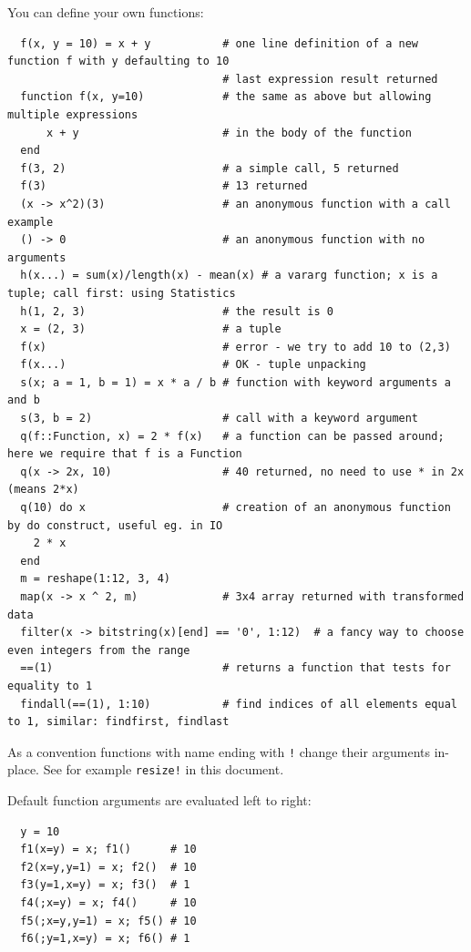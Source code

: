 \documentclass[10pt,a4paper]{article}
\begin{document}
You can define your own functions:
\begin{lstlisting}
  f(x, y = 10) = x + y           # one line definition of a new function f with y defaulting to 10
                                 # last expression result returned
  function f(x, y=10)            # the same as above but allowing multiple expressions
      x + y                      # in the body of the function
  end
  f(3, 2)                        # a simple call, 5 returned
  f(3)                           # 13 returned
  (x -> x^2)(3)                  # an anonymous function with a call example
  () -> 0                        # an anonymous function with no arguments
  h(x...) = sum(x)/length(x) - mean(x) # a vararg function; x is a tuple; call first: using Statistics
  h(1, 2, 3)                     # the result is 0
  x = (2, 3)                     # a tuple
  f(x)                           # error - we try to add 10 to (2,3)
  f(x...)                        # OK - tuple unpacking
  s(x; a = 1, b = 1) = x * a / b # function with keyword arguments a and b
  s(3, b = 2)                    # call with a keyword argument
  q(f::Function, x) = 2 * f(x)   # a function can be passed around; here we require that f is a Function
  q(x -> 2x, 10)                 # 40 returned, no need to use * in 2x (means 2*x)
  q(10) do x                     # creation of an anonymous function by do construct, useful eg. in IO
    2 * x
  end
  m = reshape(1:12, 3, 4)
  map(x -> x ^ 2, m)             # 3x4 array returned with transformed data
  filter(x -> bitstring(x)[end] == '0', 1:12)  # a fancy way to choose even integers from the range
  ==(1)                          # returns a function that tests for equality to 1
  findall(==(1), 1:10)           # find indices of all elements equal to 1, similar: findfirst, findlast
\end{lstlisting}

As a convention functions with name ending with \lstinline|!| change their
arguments in-place. See for example \lstinline|resize!| in this document.

Default function arguments are evaluated left to right:
\begin{lstlisting}
  y = 10
  f1(x=y) = x; f1()      # 10
  f2(x=y,y=1) = x; f2()  # 10
  f3(y=1,x=y) = x; f3()  # 1
  f4(;x=y) = x; f4()     # 10
  f5(;x=y,y=1) = x; f5() # 10
  f6(;y=1,x=y) = x; f6() # 1
\end{lstlisting}
\end{document}
